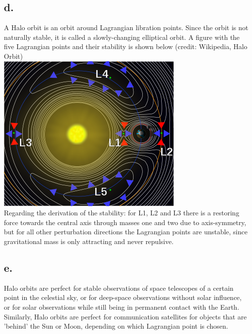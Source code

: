 \subsection*{d.}
A Halo orbit is an orbit around Lagrangian libration points. Since the orbit is not naturally stable, it is called a slowly-changing elliptical orbit. A figure with the five Lagrangian points and their stability is shown below (credit: Wikipedia, Halo Orbit)\\
\includegraphics[scale = 1]{Chapters/Halo_Orbit.png} \\
Regarding the derivation of the stability: for L1, L2 and L3 there is a restoring force towards the central axis through masses one and two due to axis-symmetry, but for all other perturbation directions the Lagrangian points are unstable, since gravitational mass is only attracting and never repulsive.

\subsection*{e.}
Halo orbits are perfect for stable observations of space telescopes of a certain point in the celestial sky, or for deep-space observations without solar influence, or for solar observations while still being in permanent contact with the Earth. Similarly, Halo orbits are perfect for communication satellites for objects that are 'behind' the Sun or Moon, depending on which Lagrangian point is chosen.